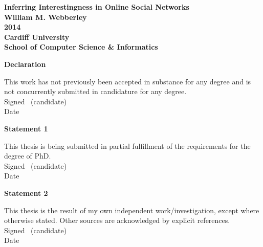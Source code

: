 




\frontmatter

\begin{titlepage}

\begin{center}
\vspace*{3ex}
\textbf{\Huge Inferring Interestingness in Online Social Networks}\\[2ex]

\textbf{\LARGE William M. Webberley}\\
\vfill
\textbf{\LARGE 2014}\\
\vfill
\textbf{\LARGE Cardiff University}\\[1ex]
\textbf{\LARGE School of Computer Science \& Informatics}\\[4ex]
\end{center}

\end{titlepage}

\newpage\thispagestyle{empty}\cleardoublepage


\thispagestyle{plain}

\vspace*{6ex}

\textbf{\large Declaration}

This work has not previously been accepted in substance for any degree and is not concurrently submitted in candidature for any degree.\\[2ex]
Signed \dotfill \ (candidate) \hspace*{10em}\\[1ex]
Date\ \ \ \ \ \dotfill \hspace*{18em}

\vfill

\textbf{\large Statement 1}

This thesis is being submitted in partial fulfillment of the requirements for the degree of PhD.\\[2ex]
Signed \dotfill \ (candidate) \hspace*{10em}\\[1ex]
Date\ \ \ \ \ \dotfill \hspace*{18em}

\textbf{\large Statement 2}

This thesis is the result of my own independent work/investigation,
except where otherwise stated. Other sources are acknowledged by
explicit references.\\[2ex]
Signed \dotfill \ (candidate) \hspace*{10em}\\[1ex]
Date\ \ \ \ \ \dotfill \hspace*{18em}

